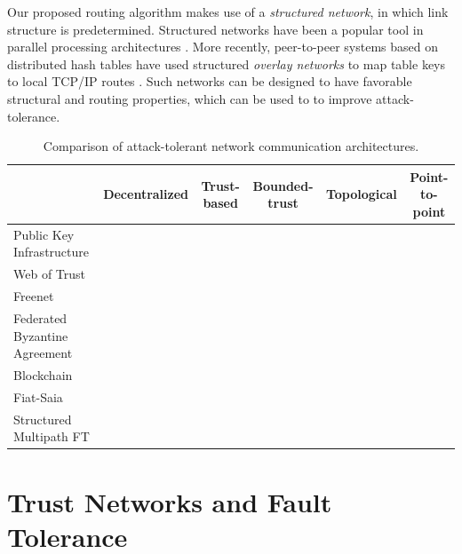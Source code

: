 \documentclass[sigconf]{acmart}
\newcommand{\cmark}{\ding{51}}
\begin{document}
Our proposed routing algorithm makes use of a
{\em structured network}, in which link structure is predetermined.
Structured networks have been a popular tool in parallel processing
architectures \cite{kshemkalyani_distributed_2008}.
More recently, peer-to-peer systems based on distributed hash tables have used
structured {\em overlay networks} to map table keys to local TCP/IP routes
\cite{lua_survey_2005,korzun_structured_2013}.
Such networks can be designed to have favorable structural and routing
properties,
which can be used to to improve attack-tolerance.

\begin{table}[t!]
\caption{Comparison of attack-tolerant network communication architectures.\label{tab:compare}}
\begin{center}
\begin{tabular}{l|ccccc}
                              & Decentralized & Trust-based & Bounded-trust & Topological & Point-to-point \\
\hline
Public Key Infrastructure     &               & \cmark      & \cmark        &             & \cmark     \\
Web of Trust                  & \cmark        & \cmark      &               &             & \cmark     \\
Freenet                       & \cmark        & \cmark      & \cmark        &             &            \\
Federated Byzantine Agreement & \cmark        & \cmark      & \cmark        &             & \cmark     \\
Blockchain                    & \cmark        &             & \cmark        &             &            \\
Fiat-Saia                     & \cmark        & \cmark      & \cmark        & \cmark      &            \\
Structured Multipath FT       & \cmark        & \cmark      & \cmark        & \cmark      & \cmark     \\
\hline
\end{tabular}
\end{center}
\end{table}

\section{Trust Networks and Fault Tolerance}
\label{sec-ft}
\end{document}
